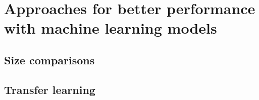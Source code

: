 \chapter{Approaches for better performance with machine learning models}
\label{chap:ch3}

\section{Size comparisons}
\label{subsec:ch3sec1}

\section{Transfer learning}
\label{subsec:ch3sec2}